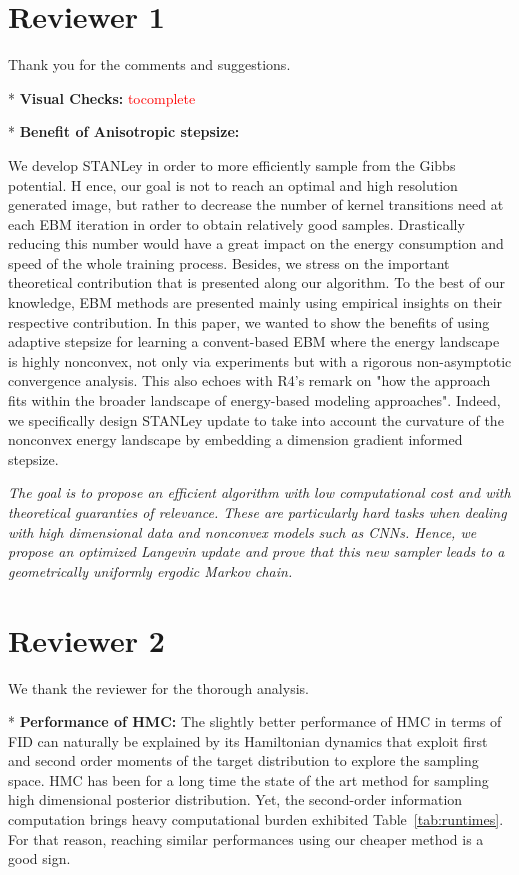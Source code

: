 \documentclass[letterpaper]{article} %
\begin{document}
\section{Reviewer 1}

Thank you for the comments and suggestions.

* \textbf{Visual Checks:} 
\textcolor{red}{tocomplete}


* \textbf{Benefit of Anisotropic stepsize:} 


We develop STANLey in order to more efficiently sample from the Gibbs potential. H
ence, our goal is not to reach an optimal and high resolution generated image, but rather to decrease the number of kernel transitions need at each EBM iteration in order to obtain relatively good samples.
Drastically reducing this number would have a great impact on the energy consumption and speed of the whole training process.
Besides, we stress on the important theoretical contribution that is presented along our algorithm. 
To the best of our knowledge, EBM methods are presented mainly using empirical insights on their respective contribution.
In this paper, we wanted to show the benefits of using adaptive stepsize for learning a convent-based EBM where the energy landscape is highly nonconvex, not only via experiments but with a rigorous non-asymptotic convergence analysis.
This also echoes with R4's remark on "how the approach fits within the broader landscape of energy-based modeling approaches".
Indeed, we specifically design STANLey update to take into account the curvature of the nonconvex energy landscape by embedding a dimension gradient informed stepsize.

\textit{The goal is to propose an efficient algorithm with low computational cost and with theoretical guaranties of relevance.
These are particularly hard tasks when dealing with high dimensional data and nonconvex models such as CNNs.
Hence, we propose an optimized Langevin update and prove that this new sampler leads to a geometrically uniformly ergodic Markov chain.}


\section{Reviewer 2}

We thank the reviewer for the thorough analysis.

* \textbf{Performance of HMC:}
The slightly better performance of HMC in terms of FID can naturally be explained by its Hamiltonian dynamics that exploit first and second order moments of the target distribution to explore the sampling space.
HMC has been for a long time the state of the art method for sampling high dimensional posterior distribution.
Yet, the second-order information computation brings heavy computational burden exhibited Table~\ref{tab:runtimes}.
For that reason, reaching similar performances using our cheaper method is a good sign.
\end{document}
